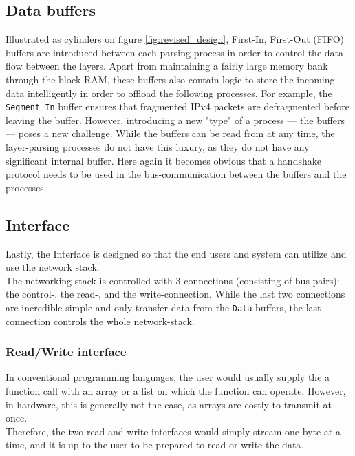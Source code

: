 \subsection{Data buffers} \label{sec:data_buffers}
Illustrated as cylinders on figure \ref{fig:revised_design}, First-In, First-Out (FIFO)
buffers are introduced between each parsing process in order to control the data-flow 
between the layers. Apart from maintaining a fairly large memory bank through 
the block-RAM, these buffers also contain logic to store the incoming data
intelligently in order to offload the following processes. For example, the
\texttt{Segment In} buffer ensures that fragmented IPv4 packets are defragmented
before leaving the buffer.
However, introducing a new "type" of a process --- the buffers --- poses a new 
challenge. While the buffers can be read from at any time, the layer-parsing
processes do not have this luxury, as they do not have any significant internal
buffer. Here again it becomes obvious that a handshake protocol needs to be used 
in the bus-communication between the buffers and the processes.


\subsection{Interface}
Lastly, the Interface is designed so that the end users and system can utilize
and use the network stack.\\
The networking stack is controlled with 3 connections (consisting of bus-pairs): 
the control-, the read-, and the write-connection. While the last two connections 
are incredible simple and only transfer data from the \texttt{Data} buffers, 
the last connection controls the whole network-stack.

\subsubsection{Read/Write interface}
In conventional programming languages, the user would usually supply the a 
function call with an array or a list on which the function can operate.
However, in hardware, this is generally not the case, as arrays are costly to 
transmit at once.\\
Therefore, the two read and write interfaces would simply stream one byte at a 
time, and it is up to the user to be prepared to read or write the data.


